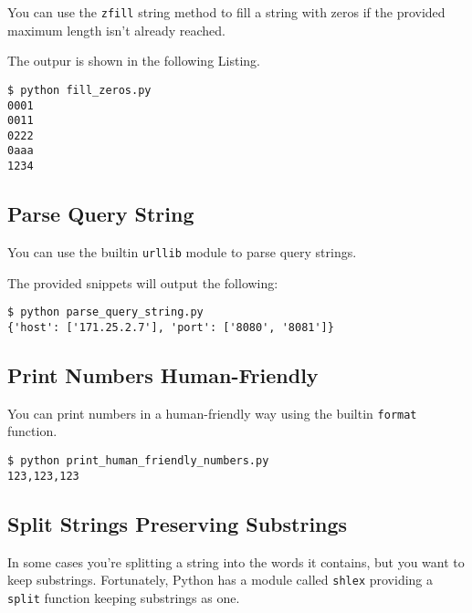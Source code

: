 You can use the \lstinline{zfill} string method to fill a string with zeros if the provided maximum length isn't already reached.



The outpur is shown in the following Listing.

\begin{lstlisting}[caption=Output of fill\_zeros.py]
$ python fill_zeros.py
0001
0011
0222
0aaa
1234
\end{lstlisting}


\subsection{Parse Query String}

You can use the builtin \lstinline{urllib} module to parse query strings.



The provided snippets will output the following:

\begin{lstlisting}[caption=Output of parse\_query\_string.py]
$ python parse_query_string.py
{'host': ['171.25.2.7'], 'port': ['8080', '8081']}
\end{lstlisting}


\subsection{Print Numbers Human-Friendly}

You can print numbers in a human-friendly way using the builtin \lstinline{format} function.



\begin{lstlisting}[caption=Output of print\_human\_friendly\_numbers.py]
$ python print_human_friendly_numbers.py
123,123,123
\end{lstlisting}


\subsection{Split Strings Preserving Substrings}

In some cases you're splitting a string into the words it contains, but you want to keep substrings.
Fortunately, Python has a module called \lstinline{shlex} providing a \lstinline{split} function keeping substrings as one.

